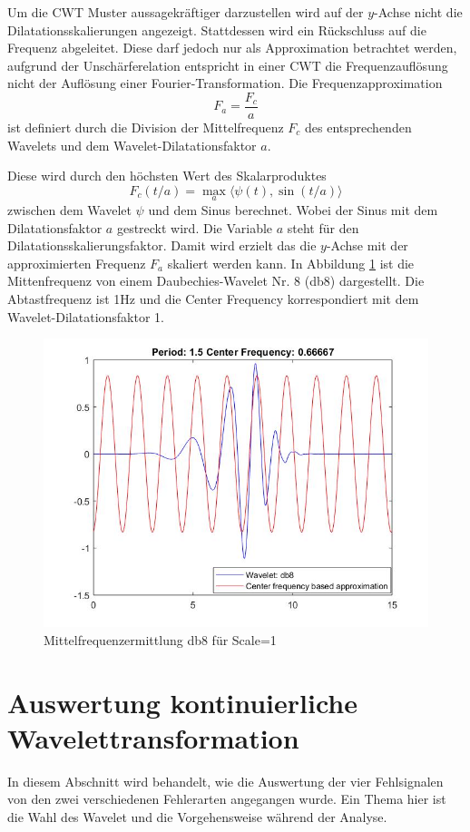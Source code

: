 \begin{refsection}
Um die CWT Muster aussagekräftiger darzustellen wird auf der $y$-Achse nicht die Dilatationsskalierungen angezeigt. Stattdessen wird ein Rückschluss auf die Frequenz abgeleitet. Diese darf jedoch nur als Approximation betrachtet werden, aufgrund der Unschärferelation entspricht in einer CWT die Frequenzauflösung nicht der Auflösung einer Fourier-Transformation. 
Die Frequenzapproximation 
\begin{equation}
F_a=\dfrac{F_c}{a}
\end{equation}
ist definiert durch die Division der Mittelfrequenz $F_c$ des entsprechenden Wavelets und dem Wavelet-Dilatationsfaktor $a$.

Diese wird durch den höchsten Wert des Skalarproduktes 
\begin{equation}
F_c(t/a) = \max_a\langle \psi(t),\sin (t/a)\rangle
\end{equation}
zwischen dem Wavelet $\psi$ und dem Sinus berechnet.
Wobei der Sinus mit dem Dilatationsfaktor $a$ gestreckt wird.
Die Variable $a$ steht für den Dilatationsskalierungsfaktor. 
Damit wird erzielt das die $y$-Achse mit der approximierten Frequenz $F_a$ skaliert werden kann.
In Abbildung \ref{fig:Mittenfrequ} ist die Mittenfrequenz von einem Daubechies-Wavelet Nr. 8 (db8) dargestellt.
Die Abtastfrequenz ist 1Hz und die Center Frequency korrespondiert mit dem Wavelet-Dilatationsfaktor 1.   

\begin{figure}
	\centering
	\includegraphics [width=0.7\linewidth] {papers/gis/Bilder/Mittenfrequenz}
	\caption{Mittelfrequenzermittlung db8 für Scale=1}
	\label{fig:Mittenfrequ}
\end{figure}


\section{Auswertung kontinuierliche Wavelettransformation}
In diesem Abschnitt wird behandelt, wie die Auswertung der vier Fehlsignalen von den zwei verschiedenen Fehlerarten angegangen wurde. 
Ein Thema hier ist die Wahl des Wavelet und die Vorgehensweise während der Analyse. 


\end{refsection}
